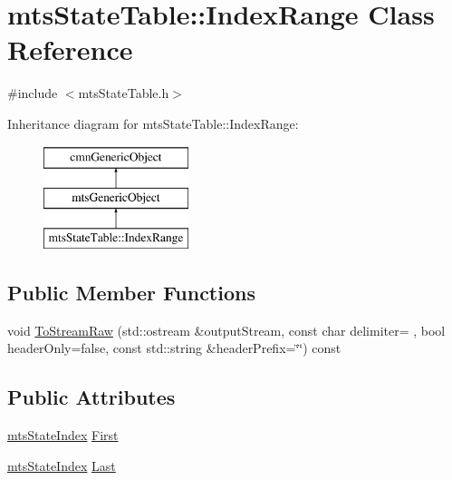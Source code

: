 \hypertarget{classmts_state_table_1_1_index_range}{}\section{mts\+State\+Table\+:\+:Index\+Range Class Reference}
\label{classmts_state_table_1_1_index_range}


{\ttfamily \#include $<$mts\+State\+Table.\+h$>$}

Inheritance diagram for mts\+State\+Table\+:\+:Index\+Range\+:\begin{figure}[H]
\begin{center}
\leavevmode
\includegraphics[height=3.000000cm]{dc/d1f/classmts_state_table_1_1_index_range}
\end{center}
\end{figure}
\subsection*{Public Member Functions}
\begin{DoxyCompactItemize}
\item 
void \hyperlink{classmts_state_table_1_1_index_range_aee1ef0cd5b41b955416cce4212dd398d}{To\+Stream\+Raw} (std\+::ostream \&output\+Stream, const char delimiter= \textquotesingle{} \textquotesingle{}, bool header\+Only=false, const std\+::string \&header\+Prefix=\char`\"{}\char`\"{}) const 
\end{DoxyCompactItemize}
\subsection*{Public Attributes}
\begin{DoxyCompactItemize}
\item 
\hyperlink{classmts_state_index}{mts\+State\+Index} \hyperlink{classmts_state_table_1_1_index_range_aacc156c9559103d4bc2092d96cbe91b0}{First}
\item 
\hyperlink{classmts_state_index}{mts\+State\+Index} \hyperlink{classmts_state_table_1_1_index_range_aa356fdcec51fde7c65c44e768d68258f}{Last}
\end{DoxyCompactItemize}


